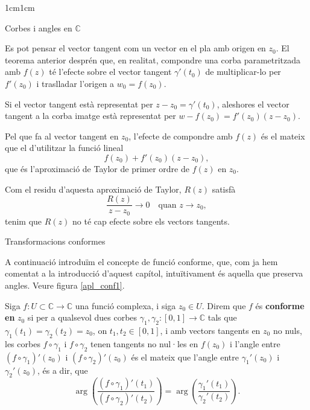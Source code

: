 \begin{adjustwidth}{1cm}{1cm}
\begin{subsection}{Corbes i angles en \texorpdfstring{$\mathbb{C}$}{C}}
    \begin{nota}
        Es pot pensar el vector tangent com un vector en el pla amb origen en $z_0$. El teorema anterior desprén que, en realitat, compondre una corba parametritzada amb $f(z)$ té l'efecte sobre el vector tangent $\gamma'(t_0)$ de multiplicar-lo per $f'(z_0)$ i traslladar l'origen a $w_0 = f(z_0)$.

        Si el vector tangent està representat per $z - z_0 = \gamma'(t_0)$, aleshores el vector tangent a la corba imatge està representat per $w - f(z_0) = f'(z_0)(z - z_0)$.

        Pel que fa al vector tangent en $z_0$, l'efecte de compondre amb $f(z)$ és el mateix que el d'utilitzar la funció lineal
        \[
        f(z_0) + f'(z_0)(z - z_0),
        \]
        que és l'aproximació de Taylor de primer ordre de $f(z)$ en $z_0$.

        Com el residu d'aquesta aproximació de Taylor, $R(z)$ satisfà
        \[
        \frac{R(z)}{z - z_0} \to 0 \quad \text{quan } z \to z_0,
        \]
        tenim que $R(z)$ no té cap efecte sobre els vectors tangents.
    \end{nota}

    \end{subsection}

    \begin{subsection}{Transformacions conformes}

    A continuació introduïm el concepte de funció conforme, que, com ja hem comentat a la introducció d'aquest capítol, intuïtivament és aquella que preserva angles. Veure figura \ref{apl_conf1}.

    \begin{definicio}
        Siga $f:U\subset \mathbb{C}\to \mathbb{C}$ una funció complexa, i siga $z_0\in U$. Direm que $f$ és \textbf{conforme en} $z_0$ si per a qualsevol dues corbes $\gamma_1,\gamma_2:[0,1]\to \mathbb{C}$ tals que $\gamma_1(t_1)=\gamma_2(t_2)=z_0$, on $t_1,t_2\in[0,1]$, i amb vectors tangents en $z_0$ no nuls, les corbes $f \circ \gamma_1$ i $f \circ \gamma_2$ tenen tangents no nul·les en $f(z_0)$ i l'angle entre $(f \circ \gamma_1)'(z_0)$ i $(f \circ \gamma_2)'(z_0)$ és el mateix que l'angle entre $\gamma_1'(z_0)$ i $\gamma_2'(z_0)$, és a dir, que 
        \[
            \operatorname{arg}\left(\frac{(f\circ\gamma_1)'(t_1)}{(f\circ\gamma_2)'(t_2)}\right)=\operatorname{arg}\left(\frac{\gamma_1'(t_1)}{\gamma_2'(t_2)}\right).
        \]

    \end{definicio}


\end{subsection}
\end{adjustwidth}
